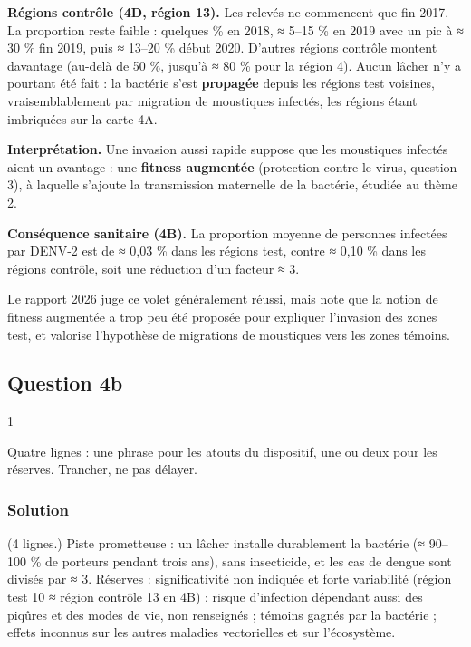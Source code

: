 \documentclass[11pt,a4paper]{article}
\begin{document}
\textbf{Régions contrôle (4D, région 13).} Les relevés ne commencent que fin 2017. La proportion reste faible : quelques \% en 2018, ≈ 5--15 \% en 2019 avec un pic à ≈ 30 \% fin 2019, puis ≈ 13--20 \% début 2020. D'autres régions contrôle montent davantage (au-delà de 50 \%, jusqu'à ≈ 80 \% pour la région 4). Aucun lâcher n'y a pourtant été fait : la bactérie s'est \textbf{propagée} depuis les régions test voisines, vraisemblablement par migration de moustiques infectés, les régions étant imbriquées sur la carte 4A.

\textbf{Interprétation.} Une invasion aussi rapide suppose que les moustiques infectés aient un avantage : une \textbf{fitness augmentée} (protection contre le virus, question 3), à laquelle s'ajoute la transmission maternelle de la bactérie, étudiée au thème 2.

\textbf{Conséquence sanitaire (4B).} La proportion moyenne de personnes infectées par DENV-2 est de ≈ 0,03 \% dans les régions test, contre ≈ 0,10 \% dans les régions contrôle, soit une réduction d'un facteur ≈ 3.

\begin{jury}

Le rapport 2026 juge ce volet généralement réussi, mais note que la notion de fitness augmentée a trop peu été proposée pour expliquer l'invasion des zones test, et valorise l'hypothèse de migrations de moustiques vers les zones témoins.

\end{jury}

\hypertarget{question-4b}{%
\subsection{Question 4b}\label{question-4b}}

\begin{indication}{1}

Quatre lignes : une phrase pour les atouts du dispositif, une ou deux pour les réserves. Trancher, ne pas délayer.

\end{indication}

\hypertarget{solution-50}{%
\subsubsection{Solution}\label{solution-50}}

(4 lignes.) Piste prometteuse : un lâcher installe durablement la bactérie (≈ 90--100 \% de porteurs pendant trois ans), sans insecticide, et les cas de dengue sont divisés par ≈ 3. Réserves : significativité non indiquée et forte variabilité (région test 10 ≈ région contrôle 13 en 4B) ; risque d'infection dépendant aussi des piqûres et des modes de vie, non renseignés ; témoins gagnés par la bactérie ; effets inconnus sur les autres maladies vectorielles et sur l'écosystème.
\end{document}
